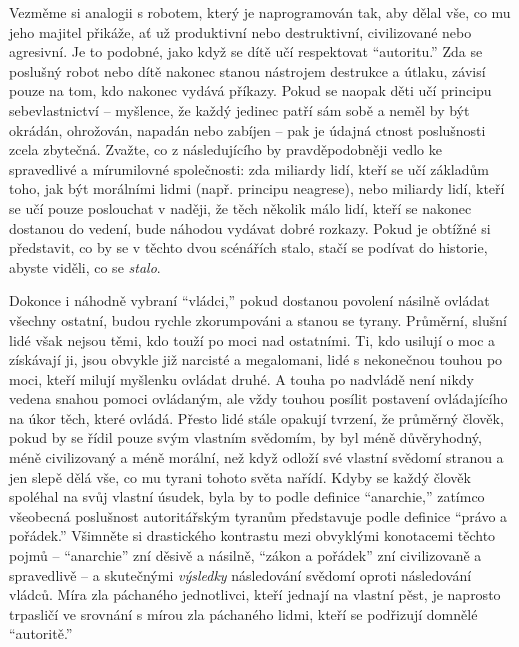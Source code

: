\documentclass{book}
\begin{document}
Vezměme si analogii s robotem, který je naprogramován tak, aby dělal vše, co mu jeho majitel přikáže, ať už produktivní nebo destruktivní, civilizované nebo agresivní. Je to podobné, jako když se dítě učí respektovat \enquote{autoritu.} Zda se poslušný robot nebo dítě nakonec stanou nástrojem destrukce a útlaku, závisí pouze na tom, kdo nakonec vydává příkazy. Pokud se naopak děti učí principu sebevlastnictví -- myšlence, že každý jedinec patří sám sobě a neměl by být okrádán, ohrožován, napadán nebo zabíjen -- pak je údajná ctnost poslušnosti zcela zbytečná. Zvažte, co z následujícího by pravděpodobněji vedlo ke spravedlivé a mírumilovné společnosti: zda miliardy lidí, kteří se učí základům toho, jak být morálními lidmi (např. principu neagrese), nebo miliardy lidí, kteří se učí pouze poslouchat v naději, že těch několik málo lidí, kteří se nakonec dostanou do vedení, bude náhodou vydávat dobré rozkazy. Pokud je obtížné si představit, co by se v těchto dvou scénářích stalo, stačí se podívat do historie, abyste viděli, co se \emph{stalo}.

Dokonce i náhodně vybraní \enquote{vládci,} pokud dostanou povolení násilně ovládat všechny ostatní, budou rychle zkorumpováni a stanou se tyrany. Průměrní, slušní lidé však nejsou těmi, kdo touží po moci nad ostatními. Ti, kdo usilují o moc a získávají ji, jsou obvykle již narcisté a megalomani, lidé s nekonečnou touhou po moci, kteří milují myšlenku ovládat druhé. A touha po nadvládě není nikdy vedena snahou pomoci ovládaným, ale vždy touhou posílit postavení ovládajícího na úkor těch, které ovládá. Přesto lidé stále opakují tvrzení, že průměrný člověk, pokud by se řídil pouze svým vlastním svědomím, by byl méně důvěryhodný, méně civilizovaný a méně morální, než když odloží své vlastní svědomí stranou a jen slepě dělá vše, co mu tyrani tohoto světa nařídí. Kdyby se každý člověk spoléhal na svůj vlastní úsudek, byla by to podle definice \enquote{anarchie,} zatímco všeobecná poslušnost autoritářským tyranům představuje podle definice \enquote{právo a pořádek.} Všimněte si drastického kontrastu mezi obvyklými konotacemi těchto pojmů -- \enquote{anarchie} zní děsivě a násilně, \enquote{zákon a pořádek} zní civilizovaně a spravedlivě -- a skutečnými \emph{výsledky} následování svědomí oproti následování vládců. Míra zla páchaného jednotlivci, kteří jednají na vlastní pěst, je naprosto trpasličí ve srovnání s mírou zla páchaného lidmi, kteří se podřizují domnělé \enquote{autoritě.}
\end{document}
